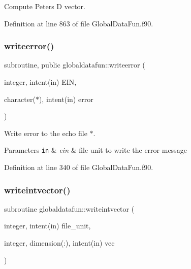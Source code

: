 Compute Peters D vector. 



Definition at line 863 of file Global\+Data\+Fun.\+f90.

\mbox{\label{namespaceglobaldatafun_ab8bdea863cb470f4098dbfd74bd27faa}} 
\subsubsection{\texorpdfstring{writeerror()}{writeerror()}}
{\footnotesize\ttfamily subroutine, public globaldatafun\+::writeerror (\begin{DoxyParamCaption}\item[{integer, intent(in)}]{E\+IN,  }\item[{character($\ast$), intent(in)}]{error }\end{DoxyParamCaption})}



Write error to the echo file $\ast$. 


\begin{DoxyParams}[1]{Parameters}
\mbox{\tt in}  & {\em ein} & file unit to write the error message \\
\hline
\end{DoxyParams}


Definition at line 340 of file Global\+Data\+Fun.\+f90.

\mbox{\label{namespaceglobaldatafun_a08c5dd4cdc68f1694d0d44f76c4df0d5}} 
\subsubsection{\texorpdfstring{writeintvector()}{writeintvector()}}
{\footnotesize\ttfamily subroutine globaldatafun\+::writeintvector (\begin{DoxyParamCaption}\item[{integer, intent(in)}]{file\+\_\+unit,  }\item[{integer, dimension(\+:), intent(in)}]{vec }\end{DoxyParamCaption})\hspace{0.3cm}{\ttfamily [private]}}



